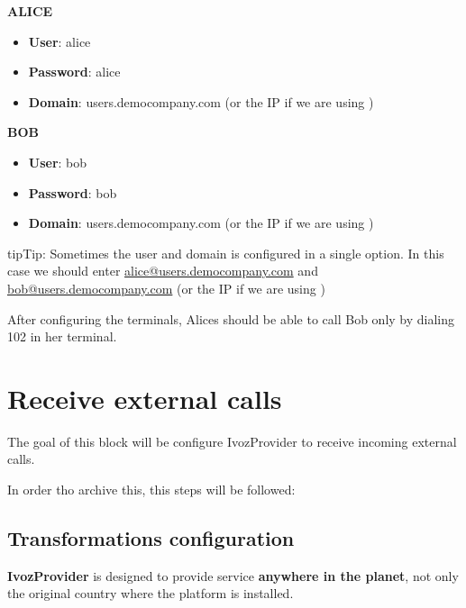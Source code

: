 \documentclass[letterpaper,10pt,english]{sphinxmanual}
\begin{document}
\textbf{ALICE}
\begin{itemize}
\item {} 
\textbf{User}: alice

\item {} 
\textbf{Password}: alice

\item {} 
\textbf{Domain}: users.democompany.com (or the IP if we are using {\hyperref[getting_started/internal_calls/brand_portal:dnshack]{}})

\end{itemize}

\textbf{BOB}
\begin{itemize}
\item {} 
\textbf{User}: bob

\item {} 
\textbf{Password}: bob

\item {} 
\textbf{Domain}: users.democompany.com (or the IP if we are using {\hyperref[getting_started/internal_calls/brand_portal:dnshack]{}})

\end{itemize}

\begin{notice}{tip}{Tip:}
Sometimes the user and domain is configured in a single option. In this
case we should enter \href{mailto:alice@users.democompany.com}{alice@users.democompany.com} and \href{mailto:bob@users.democompany.com}{bob@users.democompany.com}
(or the IP if we are using {\hyperref[getting_started/internal_calls/brand_portal:dnshack]{}})
\end{notice}

After configuring the terminals, Alices should be able to call Bob only by
dialing 102 in her terminal.


\chapter{Receive external calls}
\label{getting_started/external_incoming_calls/index::doc}\label{getting_started/external_incoming_calls/index:receive-external-calls}
The goal of this block will be configure IvozProvider to receive incoming
external calls.

In order tho archive this, this steps will be followed:


\section{Transformations configuration}
\label{getting_started/external_incoming_calls/transformations:transformations-configuration}\label{getting_started/external_incoming_calls/transformations::doc}
\textbf{IvozProvider} is designed to provide service \textbf{anywhere in the planet}, not
only the original country where the platform is installed.
\end{document}
